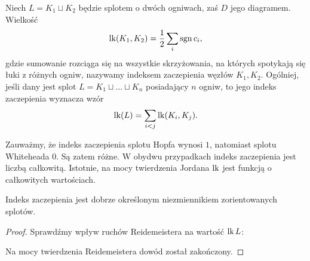 \begin{definition}
    Niech $L = K_1 \sqcup K_2$ będzie splotem o dwóch ogniwach, zaś $D$ jego diagramem.
    Wielkość
    \begin{equation}
        \operatorname{lk}(K_1, K_2) = \frac 12 \sum_i \operatorname{sgn} c_i,
    \end{equation}
    gdzie sumowanie rozciąga się na wszystkie skrzyżowania, na których spotykają się łuki z różnych ogniw, nazywamy indeksem zaczepienia węzłów $K_1, K_2$.
    Ogólniej, jeśli dany jest splot $L = K_1 \sqcup \ldots \sqcup K_n$ posiadający $n$ ogniw, to jego indeks zaczepienia wyznacza wzór
    \begin{equation}
        \operatorname{lk}(L) = \sum_{i < j} \operatorname{lk}(K_i, K_j).
    \end{equation}
\end{definition}

Zauważmy, że indeks zaczepienia splotu Hopfa wynosi $1$, natomiast splotu Whiteheada $0$.
%
%
Są zatem różne.
W obydwu przypadkach indeks zaczepienia jest liczbą całkowitą.
Istotnie, na mocy twierdzenia Jordana $\operatorname{lk}$ jest funkcją o całkowitych wartościach.

\begin{proposition}
    Indeks zaczepienia jest dobrze określonym niezmiennikiem zorientowanych splotów.
\end{proposition}

\begin{proof}
    Sprawdźmy wpływ ruchów Reidemeistera na wartość $\operatorname{lk} L$:
\begin{comment}
    \begin{figure}[H]
    \centering
    \begin{minipage}[b]{.3\linewidth}
        \[
            \MedLarReidemeisterOneLeft \cong \MedLarReidemeisterOneStraight
        \]
        \subcaption{ruch $R_1$}
    \end{minipage}
    \begin{minipage}[b]{.3\linewidth}
        \[
            \MedLarReidemeisterTwoLinkingA \cong \MedLarReidemeisterTwoB
        \]
        \subcaption{ruch $R_2$}
    \end{minipage}
    \begin{minipage}[b]{.35\linewidth}
        \[
            \MedLarReidemeisterThreeLinkingA \cong \MedLarReidemeisterThreeLinkingB
        \]
        \subcaption{ruch $R_3$}
    \end{minipage}
\end{figure}
\end{comment}
    Na mocy twierdzenia Reidemeistera dowód został zakończony.
\end{proof}

%


